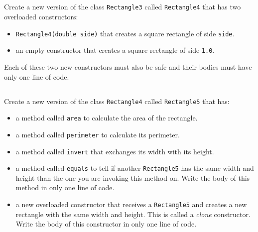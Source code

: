 \documentclass[a4paper, 11pt]{article}
\begin{document}
\subsection{}

Create a new version of the class \verb+Rectangle3+ called \verb+Rectangle4+
that has two overloaded constructors:

\begin{itemize}

  \item \verb+Rectangle4(double side)+ that creates a square rectangle of side
    \verb+side+.

  \item an empty constructor that creates a square rectangle of side \verb+1.0+.

\end{itemize}

Each of these two new constructors must also be safe and their bodies must have
only one line of code.






\subsection{}

Create a new version of the class \verb+Rectangle4+ called \verb+Rectangle5+
that has:

\begin{itemize}

  \item a method called \verb+area+ to calculate the area of the rectangle.

  \item a method called \verb+perimeter+ to calculate its perimeter.

  \item a method called \verb+invert+ that exchanges its width with its
    height.

  \item a method called \verb+equals+ to tell if another \verb+Rectangle5+ has
    the same width and height than the one you are invoking this method on.
    Write the body of this method in only one line of code.

  \item a new overloaded constructor that receives a \verb+Rectangle5+ and
    creates a new rectangle with the same width and height. This is called a
    \emph{clone} constructor. Write the body of this constructor in only one
    line of code.

\end{itemize}
\end{document}
